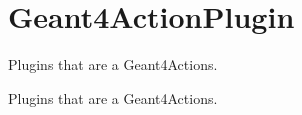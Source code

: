 \hypertarget{group___geant4_action_plugin}{}\section{Geant4\+Action\+Plugin}
\label{group___geant4_action_plugin}


Plugins that are a Geant4\+Actions.  


Plugins that are a Geant4\+Actions. 

